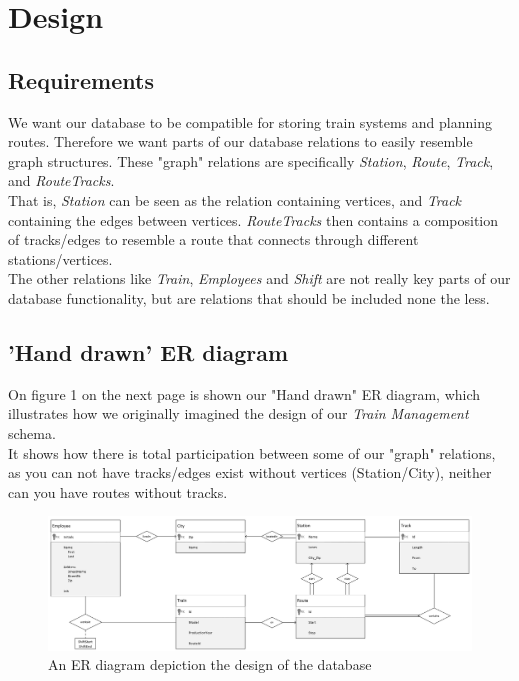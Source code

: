 \section{Design}



\subsection{Requirements} %
We want our database to be compatible for storing train systems and planning routes. Therefore we want parts of our database relations to easily resemble graph structures. These "graph" relations are specifically \emph{Station}, \emph{Route}, \emph{Track}, and \emph{RouteTracks}.\\
That is, \emph{Station} can be seen as the relation containing vertices, and \emph{Track} containing the edges between vertices. \emph{RouteTracks} then contains a composition of tracks/edges to resemble a route that connects through different stations/vertices.\\[12pt]
The other relations like \emph{Train}, \emph{Employees} and \emph{Shift} are not really key parts of our database functionality, but are relations that should be included none the less.

\subsection{'Hand drawn' ER diagram}
On figure 1 on the next page is shown our "Hand drawn" ER diagram, which illustrates how we originally imagined the design of our \emph{Train Management} schema.\\
It shows how there is total participation between some of our "graph" relations, as you can not have tracks/edges exist without vertices (Station/City), neither can you have routes without tracks.


\newpage
\begin{figure}[ht!]
    \centering
    \includegraphics[angle=90,origin=c,width=.4\textwidth]{img/Handwritten_ER}
    \caption{An ER diagram depiction the design of the database}
    \label{fig:ER}
\end{figure}

